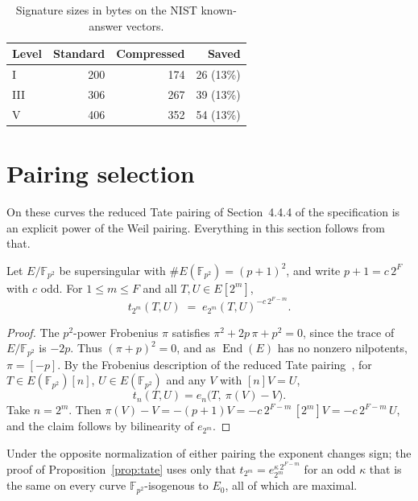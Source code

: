 \documentclass[version=preprint,notanonymous]{iacrcc}
\begin{document}
\begin{table}[H]
\centering
\caption{Signature sizes in bytes on the NIST known-answer vectors.}
\label{tab:sizes}
\small
\begin{tabular}{l r r r}
\toprule
\textbf{Level} & \textbf{Standard} & \textbf{Compressed} & \textbf{Saved} \\
\midrule
I   & 200 & 174 & 26 (13\%) \\
III & 306 & 267 & 39 (13\%) \\
V   & 406 & 352 & 54 (13\%) \\
\bottomrule
\end{tabular}
\end{table}

\section{Pairing selection}
\label{sec:pairing}

On these curves the reduced Tate pairing of Section~4.4.4 of the
specification is an explicit power of the Weil pairing. Everything in
this section follows from that.

\begin{lemma}\label{lem:tate-weil}
Let $E/\mathbb{F}_{p^2}$ be supersingular with $\#E(\mathbb{F}_{p^2}) = (p+1)^2$, and write
$p+1 = c\,2^F$ with $c$ odd.
For $1 \le m \le F$ and all $T, U \in E[2^m]$,
\[
  t_{2^m}(T,U) \;=\; e_{2^m}(T,U)^{-c\,2^{F-m}} .
\]
\end{lemma}

\begin{proof}
The $p^2$-power Frobenius $\pi$ satisfies $\pi^2 + 2p\,\pi + p^2 = 0$, since the trace of $E/\mathbb{F}_{p^2}$ is $-2p$.
Thus $(\pi + p)^2 = 0$, and as $\operatorname{End}(E)$ has no nonzero nilpotents, $\pi = [-p]$.
By the Frobenius description of the reduced Tate pairing~\cite{schaefer}, for $T \in E(\mathbb{F}_{p^2})[n]$, $U \in E(\mathbb{F}_{p^2})$ and any $V$ with $[n]V = U$,
\[
  t_n(T,U) = e_n\bigl(T,\ \pi(V) - V\bigr).
\]
Take $n = 2^m$.
Then $\pi(V) - V = -(p+1)V = -c\,2^{F-m}\,[2^m]V = -c\,2^{F-m}\,U$, and the claim follows by bilinearity of $e_{2^m}$.
\end{proof}

\begin{remark}
Under the opposite normalization of either pairing the exponent changes
sign; the proof of Proposition~\ref{prop:tate} uses only that
$t_{2^m} = e_{2^m}^{\kappa\, 2^{F-m}}$ for an odd $\kappa$ that is the
same on every curve $\mathbb{F}_{p^2}$-isogenous to $E_0$, all of which
are maximal.
\end{remark}
\end{document}
